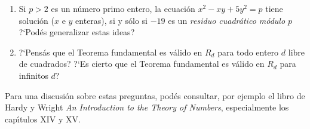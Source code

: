 \begin{enumerate}[label=P\arabic*]
\begin{enumerate}[label=(\alph*)]
{					El Teorema fundamental de la
					Aritm\'etica es consecuencia de la
					resolubilidad de estas ecuaciones.
					As\'{\i}, vemos que dicho Teorema
					es v\'alido en $R_{-19}$, aunque
					no exista en este sistema un
					algoritmo de divisi\'on.
				}
			\item
				Si $p>2$ es un n\'umero primo entero,
				la ecuaci\'on
				\begin{math}
					x^2-xy+
						5y^2=p
				\end{math}
				tiene soluci\'on ($x$ e $y$
				enteras), si y s\'olo si
				$-19$ es un \emph{residuo cuadr\'atico %
				m\'odulo $p$}
				?`Pod\'es generalizar estas ideas?
			\item
				?`Pens\'as que el Teorema fundamental
				es v\'alido en $R_d$ para todo entero
				$d$ libre de cuadrados?
				?`Es cierto que el Teorema fundamental
				es v\'alido en $R_d$ para infinitos $d$?
		\end{enumerate}
		Para una discusi\'on sobre estas preguntas, pod\'es
		consultar, por ejemplo el libro de Hardy y Wright
		\textit{An Introduction to the Theory of Numbers},
		especialmente los cap\'{\i}tulos XIV y XV.
\end{enumerate}
%

